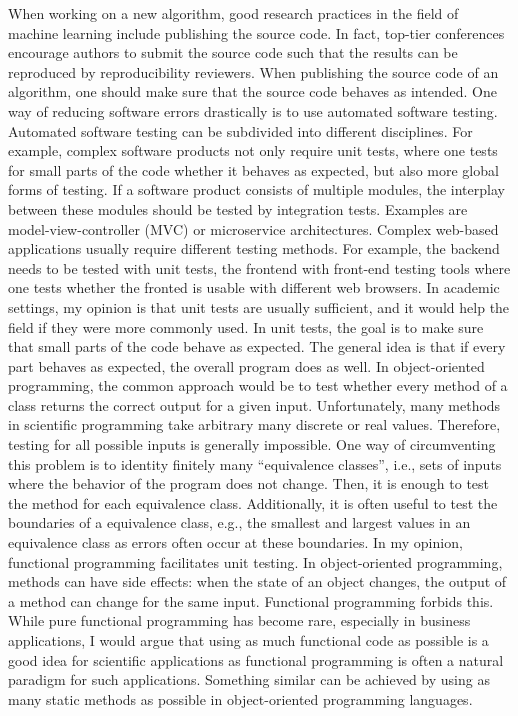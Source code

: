 \documentclass{article}
\begin{document}
    When working on a new algorithm, good research practices in the field of machine learning include publishing the source code.
    In fact, top-tier conferences encourage authors to submit the source code such that the results can be reproduced by reproducibility reviewers.
    When publishing the source code of an algorithm, one should make sure that the source code behaves as intended.
    One way of reducing software errors drastically is to use automated software testing.
    Automated software testing can be subdivided into different disciplines.
    For example, complex software products not only require unit tests, where one tests for small parts of the code whether it behaves as expected, but also more global forms of testing.
    If a software product consists of multiple modules, the interplay between these modules should be tested by integration tests.
    Examples are model-view-controller (MVC) or microservice architectures.
    Complex web-based applications usually require different testing methods.
    For example, the backend needs to be tested with unit tests, the frontend with front-end testing tools where one tests whether the fronted is usable with different web browsers.
    In academic settings, my opinion is that unit tests are usually sufficient, and it would help the field if they were more commonly used.
    In unit tests, the goal is to make sure that small parts of the code behave as expected.
    The general idea is that if every part behaves as expected, the overall program does as well.
    In object-oriented programming, the common approach would be to test whether every method of a class returns the correct output for a given input.
    Unfortunately, many methods in scientific programming take arbitrary many discrete or real values.
    Therefore, testing for all possible inputs is generally impossible.
    One way of circumventing this problem is to identity finitely many ``equivalence classes'', i.e., sets of inputs where the behavior of the program does not change.
    Then, it is enough to test the method for each equivalence class.
    Additionally, it is often useful to test the boundaries of a equivalence class, e.g., the smallest and largest values in an equivalence class as errors often occur at these boundaries.
    In my opinion, functional programming facilitates unit testing.
    In object-oriented programming, methods can have side effects: when the state of an object changes, the output of a method can change for the same input.
    Functional programming forbids this.
    While pure functional programming has become rare, especially in business applications, I would argue that using as much functional code as possible is a good idea for scientific applications as functional programming is often a natural paradigm for such applications.
    Something similar can be achieved by using as many static methods as possible in object-oriented programming languages.
\end{document}
